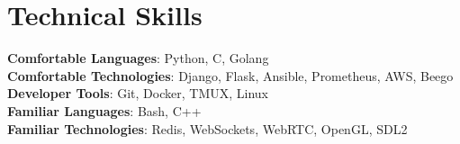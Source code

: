 \documentclass[letterpaper,11pt]{article}
\begin{document}
%
\section{Technical Skills}
 \begin{itemize}[leftmargin=0.15in, label={}]
    \small{\item{
     \textbf{Comfortable Languages}{: Python, C, Golang} \\
     \textbf{Comfortable Technologies}{: Django, Flask, Ansible, Prometheus, AWS, Beego} \\
     \textbf{Developer Tools}{: Git, Docker, TMUX, Linux} \\
     \textbf{Familiar Languages}{: Bash, C++} \\
     \textbf{Familiar Technologies}{: Redis, WebSockets, WebRTC, OpenGL, SDL2} \\
    }}
 \end{itemize}


\end{document}
